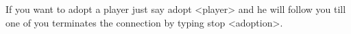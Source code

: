 If you want to adopt a player just say 
adopt <player> and he will follow you     
till one of you terminates the connection
by typing stop <adoption>.

